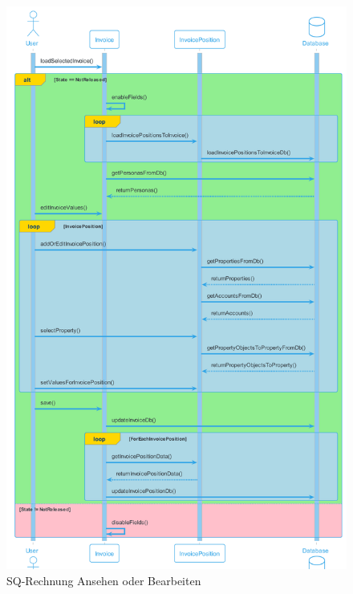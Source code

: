 \begin{figure}[H]
  \begin{center}
    \includegraphics[height=1\textheight]{content/diagrams/out/sequenzdiagram/rechnungAnsehenBearbeiten/RechnungAnsehenBearbeiten.png}
    \caption{SQ-Rechnung Ansehen oder Bearbeiten}
  \end{center}
\end{figure}